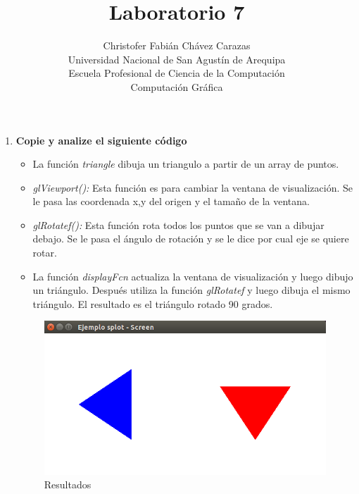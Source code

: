\documentclass[a4paper,12pt]{article}
\begin{document}
\title{Laboratorio 7}
\author{
Christofer Fabián Chávez Carazas \\
\small{Universidad Nacional de San Agustín de Arequipa} \\
\small{Escuela Profesional de Ciencia de la Computación} \\
\small{Computación Gráfica}
}
\date{}

\maketitle

\begin{enumerate}
 \item \textbf{Copie y analize el siguiente código}
 \begin{itemize}
  \item La función \textit{triangle} dibuja un triangulo a partir de un array de puntos.
  \item \textit{glViewport():} Esta función es para cambiar la ventana de visualización. Se le pasa las coordenada x,y del origen y el tamaño de la ventana.
  \item \textit{glRotatef():} Esta función rota todos los puntos que se van a dibujar debajo. Se le pasa el ángulo de rotación y se le dice por cual eje se quiere rotar.
  \item La función \textit{displayFcn} actualiza la ventana de visualización y luego dibujo un triángulo. Después utiliza la función \textit{glRotatef} y luego dibuja el
  mismo triángulo. El resultado es el triángulo rotado 90 grados.
 \end{itemize}

 \begin{figure}[H]
  \centering
  \includegraphics[scale = 0.5]{1.png}
  \caption{Resultados}
 \end{figure}


\end{enumerate}
\end{document}
